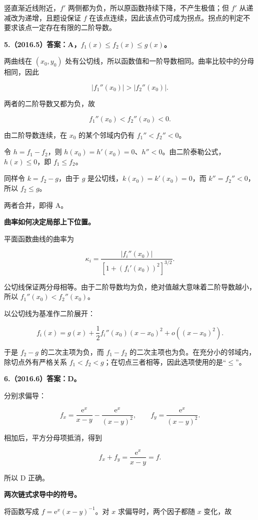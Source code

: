 \documentclass[UTF8,11pt,fontset=windows]{ctexart}
\begin{document}
竖直渐近线附近，$f'$ 两侧都为负，所以原函数持续下降，不产生极值；但 $f'$ 从递减改为递增，且题设保证 $f$ 在该点连续，因此该点仍可成为拐点。拐点的判定不要求该点一定存在有限的二阶导数。

\clearpage

\textbf{5.（2016.5）答案：A，$f_1(x)\le f_2(x)\le g(x)$。}

两曲线在 $(x_0,y_0)$ 处有公切线，所以函数值和一阶导数相同。曲率比较中的分母相同，因此

$$
|f_1''(x_0)|>|f_2''(x_0)|.
$$

两者的二阶导数又都为负，故

$$
f_1''(x_0)<f_2''(x_0)<0.
$$

由二阶导数连续，在 $x_0$ 的某个邻域内仍有 $f_1''<f_2''<0$。

令 $h=f_1-f_2$，则 $h(x_0)=h'(x_0)=0$、$h''<0$。由二阶泰勒公式，$h(x)\le0$，即 $f_1\le f_2$。

同样令 $k=f_2-g$，由于 $g$ 是公切线，$k(x_0)=k'(x_0)=0$，而 $k''=f_2''<0$，所以 $f_2\le g$。

两者合并，即得 A。

\textbf{曲率如何决定局部上下位置。}

平面函数曲线的曲率为

$$
\kappa_i=\frac{|f_i''(x_0)|}{[1+(f_i'(x_0))^2]^{3/2}}.
$$

公切线保证两分母相等。由于二阶导数均为负，绝对值越大意味着二阶导数越小，所以 $f_1''(x_0)<f_2''(x_0)$。

以公切线为基准作二阶展开：

$$
f_i(x)=g(x)+\frac12f_i''(x_0)(x-x_0)^2+o((x-x_0)^2).
$$

于是 $f_2-g$ 的二次主项为负，而 $f_1-f_2$ 的二次主项也为负。在充分小的邻域内，除切点外有严格关系 $f_1<f_2<g$；在切点三者相等，因此选项使用的是“$\le$”。

\clearpage

\textbf{6.（2016.6）答案：D。}

分别求偏导：

$$
f_x=\frac{\mathrm e^x}{x-y}-\frac{\mathrm e^x}{(x-y)^2},
\qquad
f_y=\frac{\mathrm e^x}{(x-y)^2}.
$$

相加后，平方分母项抵消，得到

$$
f_x+f_y=\frac{\mathrm e^x}{x-y}=f.
$$

所以 D 正确。

\textbf{两次链式求导中的符号。}

将函数写成 $f=\mathrm e^x(x-y)^{-1}$。对 $x$ 求偏导时，两个因子都随 $x$ 变化，故
\end{document}
